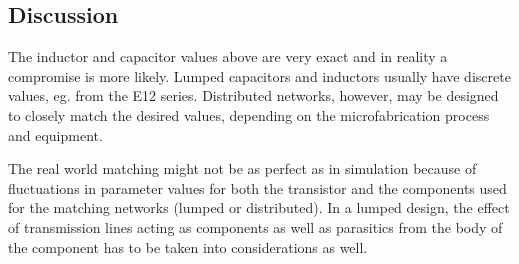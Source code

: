 \documentclass[report.tex]{subfiles}
\begin{document}
\subsection{Discussion}

The inductor and capacitor values above are very exact and in reality a compromise is more likely. Lumped capacitors and inductors usually have discrete values, eg. from the E12 series. Distributed networks, however, may be designed to closely match the desired values, depending on the microfabrication process and equipment.

The real world matching might not be as perfect as in simulation because of fluctuations in parameter values for both the transistor and the components used for the matching networks (lumped or distributed). In a lumped design, the effect of transmission lines acting as components as well as parasitics from the body of the component has to be taken into considerations as well.
\end{document}
